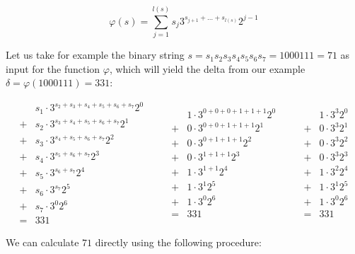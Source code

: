 \documentclass[12pt]{amsart}
\theoremstyle{definition}
\begin{document}
\begin{equation}
\label{eq:phi}
\varphi(s)=\sum_{j=1}^{l(s)}s_j3^{s_{j+1}+\ldots+s_{l(s)}}2^{j-1}
\end{equation}

\noindent
Let us take for example the binary string $s=s_1s_2s_3s_4s_5s_6s_7=1000111=71$ as input for the function $\varphi$, which will yield the delta from our example $\delta=\varphi(1000111)=331$:

\[
\begin{array}{ll}
&s_1\cdot3^{s_2+s_3+s_4+s_5+s_6+s_7}2^0\\
+&s_2\cdot3^{s_3+s_4+s_5+s_6+s_7}2^1\\
+&s_3\cdot3^{s_4+s_5+s_6+s_7}2^2\\
+&s_4\cdot3^{s_5+s_6+s_7}2^3\\
+&s_5\cdot3^{s_6+s_7}2^4\\
+&s_6\cdot3^{s_7}2^5\\
+&s_7\cdot3^{0}2^6\\
=&331
\end{array}\qquad
\begin{array}{ll}
&1\cdot3^{0+0+0+1+1+1}2^0\\
+&0\cdot3^{0+0+1+1+1}2^1\\
+&0\cdot3^{0+1+1+1}2^2\\
+&0\cdot3^{1+1+1}2^3\\
+&1\cdot3^{1+1}2^4\\
+&1\cdot3^{1}2^5\\
+&1\cdot3^{0}2^6\\
=&331
\end{array}\qquad
\begin{array}{ll}
&1\cdot3^{3}2^0\\
+&0\cdot3^{3}2^1\\
+&0\cdot3^{3}2^2\\
+&0\cdot3^{3}2^3\\
+&1\cdot3^{2}2^4\\
+&1\cdot3^{1}2^5\\
+&1\cdot3^{0}2^6\\
=&331
\end{array}
\]

\par\medskip\noindent
We can calculate $71$ directly using the following procedure:
\end{document}
